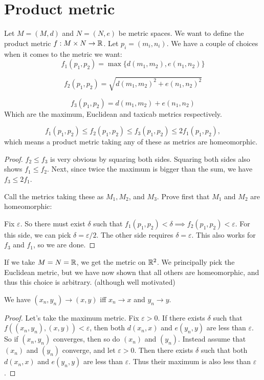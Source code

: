 \documentclass[11pt]{scrreport}
\begin{document}
\section{Product metric}
Let $M = (M,d)$ and $N = (N,e)$ be metric spaces. We want to define the product metric $f : M\times N\to \mathbb R$. Let $p_i = (m_i, n_i)$. We have a couple of choices when it comes to the metric we want:
\[
    f_1(p_1,p_2) = \max\{d(m_1,m_2), e(n_1,n_2)\}
\]

\[
    f_2(p_1,p_2) = \sqrt{d(m_1,m_2)^2+e(n_1,n_2)^2}
\]

\[
    f_3(p_1,p_2) = d(m_1,m_2)+e(n_1,n_2)
\]
Which are the maximum, Euclidean and taxicab metrics respectively.
\begin{proposition}
    \[f_1(p_1,p_2) \leq f_2(p_1,p_2) \leq f_3(p_1,p_2) \leq 2f_1(p_1,p_2),\]
    which means a product metric taking any of these as metrics are homeomorphic.
\end{proposition}
\begin{proof}
    $f_2\leq f_3$ is very obvious by squaring both sides. Squaring both sides also shows $f_1\leq f_2$. Next, since twice the maximum is bigger than the sum, we have $f_3\leq 2f_1$.

    Call the metrics taking these as $M_1,M_2$, and $M_3$. Prove first that $M_1$ and $M_2$ are homeomorphic:

    Fix $\varepsilon$. So there must exist $\delta$ such that $f_1(p_1,p_2)< \delta \implies f_2(p_1,p_2)< \varepsilon$.
    For this side, we can pick $\delta = \varepsilon/2$. The other side requires $\delta = \varepsilon$. This also works for $f_3$ and $f_1$, so we are done.
\end{proof}
\begin{example}
    If we take $M=N=\mathbb R$, we get the metric on $\mathbb R^2$. We principally pick the Euclidean metric, but we have now shown that all others are homeomorphic, and thus this choice is arbitrary. (although well motivated)
\end{example}
\begin{proposition}
    We have $(x_n,y_n)\to (x,y)$ iff $x_n\to x$ and $y_n \to y$.
\end{proposition}
\begin{proof}
    Let's take the maximum metric. Fix $\varepsilon>0$. If there exists $\delta$ such that $f((x_n,y_n),(x,y))< \varepsilon$, then both $d(x_n,x)$ and $e(y_n,y)$ are less than $\varepsilon$. So if $(x_n,y_n)$ converges, then so do $(x_n)$ and $(y_n)$. Instead assume that $(x_n)$ and $(y_n)$ converge, and let $\varepsilon>0$. Then there exists $\delta$ such that both $d(x_n,x)$ and $e(y_n,y)$ are less than $\varepsilon$. Thus their maximum is also less than $\varepsilon$.
\end{proof}
\end{document}
